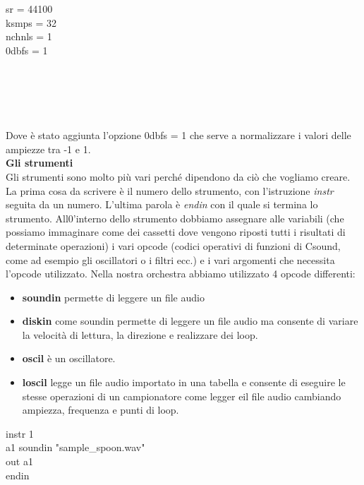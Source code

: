 \documentclass[11pt]{article}
\begin{document}
\begin{multicols*}{2}
\begin{center}
\begin{minipage}[c]{6.2cm}
\begin{sffamily}
sr = 44100\\
ksmps = 32\\
nchnls = 1\\
0dbfs = 1\\

\end{sffamily}\\
\end{minipage}\\
\end{center}\\

Dove è stato aggiunta l'opzione 0dbfs = 1 che  serve a normalizzare i valori delle ampiezze tra -1 e 1.\\

\textbf{\textsf {Gli strumenti}}\\

\noindent Gli strumenti sono molto più vari perché dipendono da ciò che vogliamo creare.
La prima cosa da scrivere è il numero dello strumento, con l'istruzione \textit {instr} seguita da un
numero. L'ultima parola è \textit {endin} con il quale si termina lo strumento. All0'interno dello strumento
dobbiamo assegnare alle variabili (che possiamo immaginare come dei cassetti dove vengono riposti
tutti i risultati di determinate operazioni) i vari opcode (codici operativi di funzioni di Csound, come ad
esempio gli oscillatori o i filtri ecc.) e i vari argomenti che necessita l'opcode utilizzato.
Nella nostra orchestra abbiamo utilizzato 4 opcode differenti:

\begin{itemize}
\item \textbf{soundin} permette di leggere un file audio 
\item \textbf{diskin} come soundin permette di leggere un file audio ma consente di variare la velocità di lettura, la direzione e realizzare dei loop.
\item \textbf{oscil} è un oscillatore.
\item \textbf{loscil} legge un file audio importato in una tabella e consente di eseguire le stesse operazioni di un campionatore come legger eil file audio cambiando ampiezza, frequenza e punti di loop.
\end{itemize}

\begin{center}
\begin{minipage}[c]{6.2cm}
\begin{sffamily}
\scriptsize

instr 1\\
a1 soundin "sample\_spoon.wav"\\
out a1\\
endin\\


\end{sffamily}
\end{minipage}
\end{center}
\end{multicols*}
\end{document}
